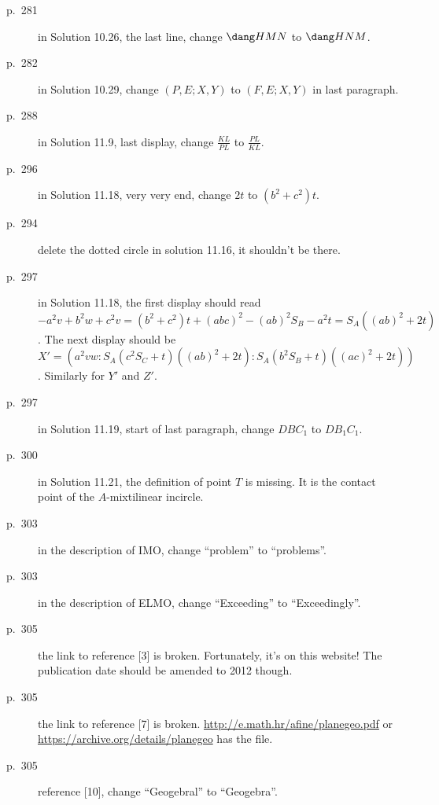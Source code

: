 \documentclass[11pt]{scrartcl}
\begin{document}
\begin{description}
\item[p.\  281] in Solution 10.26, the last line, change $\dang HMN$ to $\dang HNM$.
\item[p.\  282] in Solution 10.29, change $(P,E;X,Y)$ to $(F,E;X,Y)$ in last paragraph.
\item[p.\  288] in Solution 11.9, last display, change $\frac{KL}{PL}$ to $\frac{PL}{KL}$.
\item[p.\  296] in Solution 11.18, very very end, change $2t$ to $(b^2+c^2)t$.
\item[p.\  294] delete the dotted circle in solution 11.16, it shouldn't be there.
\item[p.\  297] in Solution 11.18, the first display should read
  $-a^2v + b^2w + c^2v = (b^2+c^2)t + (abc)^2 - (ab)^2S_B - a^2t = S_A ((ab)^2 + 2t)$.
  The next display should be
  $X' = \left( a^2vw : S_A(c^2S_C+t)((ab)^2+2t) : S_A(b^2S_B+t)((ac)^2+2t) \right)$.
  Similarly for $Y'$ and $Z'$.
\item[p.\  297] in Solution 11.19, start of last paragraph, change $DBC_1$ to $DB_1C_1$.
\item[p.\  300] in Solution 11.21, the definition of point $T$ is missing.
  It is the contact point of the $A$-mixtilinear incircle.
\item[p.\  303] in the description of IMO, change ``problem'' to ``problems''.
\item[p.\  303] in the description of ELMO, change ``Exceeding'' to ``Exceedingly''.
\item[p.\  305] the link to reference [3] is broken. Fortunately, it's on this website!
  The publication date should be amended to 2012 though.
\item[p.\  305] the link to reference [7] is broken. \url{http://e.math.hr/afine/planegeo.pdf}
  or \url{https://archive.org/details/planegeo} has the file.
\item[p.\  305] reference [10], change ``Geogebral'' to ``Geogebra''.
\end{description}
\end{document}
